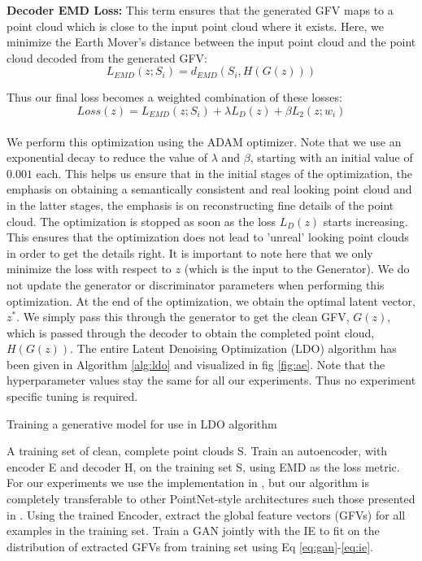 \documentclass[10pt,twocolumn,letterpaper]{article}
\begin{document}
\textbf{Decoder EMD Loss:} This term ensures that the generated GFV maps to a point cloud which is close to the input point cloud where it exists. Here, we minimize the Earth Mover's distance between the input point cloud and the point cloud decoded from the generated GFV:
\begin{equation}
    L_{EMD}(z;S_i) = d_{EMD}(S_i, H(G(z)))
\end{equation}


Thus our final loss becomes a weighted combination of these losses:
\begin{equation}
    Loss(z) = L_{EMD}(z;S_i) + \lambda L_D(z) + \beta L_2(z;w_i) %
\end{equation}\\
We perform this optimization using the ADAM optimizer. Note that we use an exponential decay to reduce the value of $\lambda$ and $\beta$, starting with an initial value of $0.001$ each. This helps us ensure that in the initial stages of the optimization, the emphasis on obtaining a semantically consistent and real looking point cloud and in the latter stages, the emphasis is on reconstructing fine details of the point cloud. The optimization is stopped as soon as the loss $L_D(z)$ starts increasing. This ensures that the optimization does not lead to 'unreal' looking point clouds in order to get the details right. It is important to note here that we only minimize the loss with respect to $z$ (which is the input to the Generator). We do not update the generator or discriminator parameters when performing this optimization. At the end of the optimization, we obtain the optimal latent vector, $z^*$. We simply pass this through the generator to get the clean GFV, $G(z)$, which is passed through the decoder to obtain the completed point cloud, $H(G(z))$. The entire Latent Denoising Optimization (LDO) algorithm has been given in Algorithm \ref{alg:ldo} and visualized in fig \ref{fig:ae}. Note that the hyperparameter values stay the same for all our experiments. Thus no experiment specific tuning is required.

 \begin{algorithm}[H]
 \caption{Training a generative model for use in LDO algorithm}\label{alg:training}
 \begin{algorithmic}[1]
 \renewcommand{\algorithmicrequire}{\textbf{Require:}}
 \renewcommand{\algorithmicrequire}{\textbf{Require:}}
 \REQUIRE A training set of clean, complete point clouds S.
 \STATE Train an autoencoder, with encoder E and decoder H, on the training set S, using EMD as the loss metric. For our experiments we use the implementation in \cite{latentgan}, but our algorithm is completely transferable to other PointNet-style architectures such those presented in \cite{pnetplus,foldingnet}.
\STATE Using the trained Encoder, extract the global feature vectors (GFVs) for all examples in the training set.
\STATE Train a GAN jointly with the IE to fit on the distribution of extracted GFVs from training set using Eq \ref{eq:gan}-\ref{eq:ie}.
 \end{algorithmic} 
 \end{algorithm}
 
\end{document}
